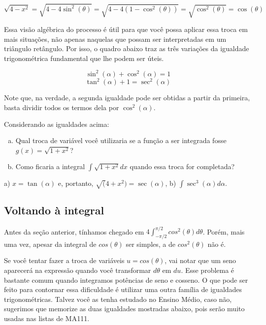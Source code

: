\documentclass[main_estudante.tex]{subfiles}
\begin{document}
$$\sqrt{4-x^2} = \sqrt{4-4\sin^2(\theta)} = \sqrt{4-4(1-\cos^2(\theta))} = \sqrt{\cos^2(\theta)} = \cos(\theta)$$

Essa visão algébrica do processo é útil para que você possa aplicar essa troca em mais situações, não apenas naquelas que possam ser interpretadas em um triângulo retângulo. Por isso, o quadro abaixo traz as três variações da igualdade trigonométrica fundamental que lhe podem ser úteis.

\begin{shaded*}
$$\sin^2(\alpha) + \cos^2(\alpha)=1$$
$$\tan^2(\alpha) + 1= \sec^2(\alpha)$$
\end{shaded*}

Note que, na verdade, a segunda igualdade pode ser obtidas a partir da primeira, basta dividir todos os termos dela por $\cos^2(\alpha)$.

\begin{questao}
Considerando as igualdades acima:
\begin{enumerate}[a)]
\item Qual troca de variável você utilizaria se a função a ser integrada fosse $g(x)=\sqrt{1+x^2}$?
\item Como ficaria a integral $\int \sqrt{1+x^2} dx$ quando essa troca for completada?
\end{enumerate}
\end{questao}


\begin{gabarito}
	\begin{gabaritoQuestao}
		a) $x=\tan(\alpha)$ e, portanto, $\sqrt(4+x^2)=\sec(\alpha)$, b) $\int \sec^3(\alpha)d\alpha$.
	\end{gabaritoQuestao}
\end{gabarito}

\subsection*{Voltando à integral}

Antes da seção anterior, tínhamos chegado em $4\int_{-\pi/2}^{\pi/2} cos^2(\theta)d\theta$. Porém, mais uma vez, apesar da integral de $cos(\theta)$ ser simples, a de $cos^2(\theta)$ não é.

Se você tentar fazer a troca de variáveis $u=cos(\theta)$, vai notar que um seno aparecerá na expressão quando você transformar $d\theta$ em $du$. Esse problema é bastante comum quando integramos potências de seno e cosseno. O que pode ser feito para contornar essa dificuldade é utilizar uma outra família de igualdades trigonométricas. Talvez você as tenha estudado no Ensino Médio, caso não, sugerimos que memorize as duas igualdades mostradas abaixo, pois serão muito usadas nas listas de MA111.
\end{document}
